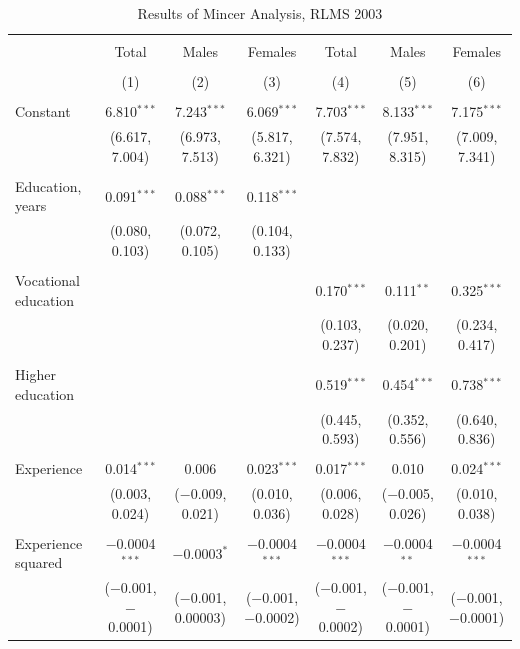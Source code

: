 \documentclass[alpha-refs]{wiley-article-01g}
\begin{document}
\begin{landscape}

\fontsize{9}{11}
\selectfont

\begin{table}[!htbp] \centering 
\renewcommand{\arraystretch}{1.0}
  \caption{Results of Mincer Analysis, RLMS 2003} 
  \label{} 
\begin{tabular}{@{\extracolsep{5pt}}lcccccc} 
\\[-1.8ex]\hline 
\hline \\[-1.8ex] 
 & Total & Males & Females & Total & Males & Females \\ 
\\[-1.8ex] & (1) & (2) & (3) & (4) & (5) & (6)\\ 
\hline \\[-1.8ex] 
 Constant & 6.810$^{***}$ & 7.243$^{***}$ & 6.069$^{***}$ & 7.703$^{***}$ & 8.133$^{***}$ & 7.175$^{***}$ \\ 
  & (6.617, 7.004) & (6.973, 7.513) & (5.817, 6.321) & (7.574, 7.832) & (7.951, 8.315) & (7.009, 7.341) \\ 
  & & & & & & \\ 
 Education, years & 0.091$^{***}$ & 0.088$^{***}$ & 0.118$^{***}$ &  &  &  \\ 
  & (0.080, 0.103) & (0.072, 0.105) & (0.104, 0.133) &  &  &  \\ 
  & & & & & & \\ 
 Vocational education &  &  &  & 0.170$^{***}$ & 0.111$^{**}$ & 0.325$^{***}$ \\ 
  &  &  &  & (0.103, 0.237) & (0.020, 0.201) & (0.234, 0.417) \\ 
  & & & & & & \\ 
 Higher education &  &  &  & 0.519$^{***}$ & 0.454$^{***}$ & 0.738$^{***}$ \\ 
  &  &  &  & (0.445, 0.593) & (0.352, 0.556) & (0.640, 0.836) \\ 
  & & & & & & \\ 
 Experience & 0.014$^{***}$ & 0.006 & 0.023$^{***}$ & 0.017$^{***}$ & 0.010 & 0.024$^{***}$ \\ 
  & (0.003, 0.024) & ($-$0.009, 0.021) & (0.010, 0.036) & (0.006, 0.028) & ($-$0.005, 0.026) & (0.010, 0.038) \\ 
  & & & & & & \\ 
 Experience squared & $-$0.0004$^{***}$ & $-$0.0003$^{*}$ & $-$0.0004$^{***}$ & $-$0.0004$^{***}$ & $-$0.0004$^{**}$ & $-$0.0004$^{***}$ \\ 
  & ($-$0.001, $-$0.0001) & ($-$0.001, 0.00003) & ($-$0.001, $-$0.0002) & ($-$0.001, $-$0.0002) & ($-$0.001, $-$0.0001) & ($-$0.001, $-$0.0001) \\ 

\end{tabular}
\end{table}
\end{landscape}
\end{document}
